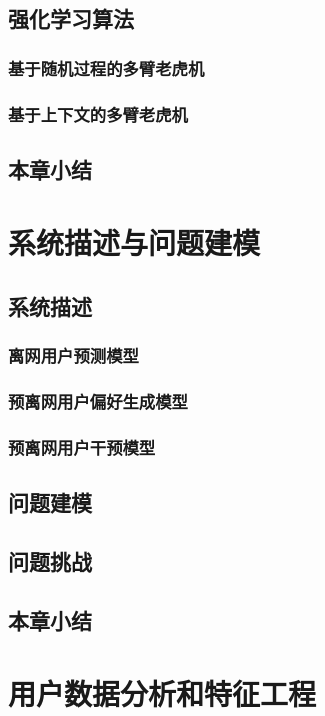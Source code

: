 \subsection{强化学习算法}
\subsubsection{基于随机过程的多臂老虎机}
\subsubsection{基于上下文的多臂老虎机}
\subsection{本章小结}

\section{系统描述与问题建模}
\subsection{系统描述}
\subsubsection{离网用户预测模型}
\subsubsection{预离网用户偏好生成模型}
\subsubsection{预离网用户干预模型}
\subsection{问题建模}
\subsection{问题挑战}
\subsection{本章小结}

\section{用户数据分析和特征工程}
